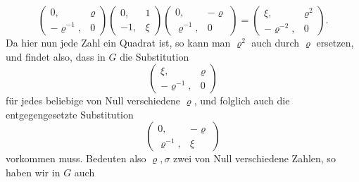 \[
\begin{pmatrix} 0, & \varrho \\ -\varrho^{-1}, & 0 \end{pmatrix}\begin{pmatrix} 0, & 1 \\ -1, & \xi \end{pmatrix}\begin{pmatrix} 0, & -\varrho \\ \varrho^{-1}, & 0 \end{pmatrix} = \begin{pmatrix} \xi, & \varrho^2 \\ -\varrho^{-2}, & 0 \end{pmatrix}.
\]
Da hier nun jede Zahl ein Quadrat ist, so kann man $\varrho^2$ auch durch $\varrho$ ersetzen, und findet also, dass in $G$ die Substitution
\[
\begin{pmatrix} \xi, & \varrho \\ -\varrho^{-1}, & 0 \end{pmatrix}
\]
f\"ur jedes beliebige von Null verschiedene $\varrho$, und folglich auch die entgegengesetzte Substitution
\[
\begin{pmatrix} 0, & -\varrho \\ \varrho^{-1}, & \xi \end{pmatrix}
\]
vorkommen muss. Bedeuten also $\varrho,\sigma$ zwei von Null verschiedene Zahlen, so haben wir in $G$ auch
